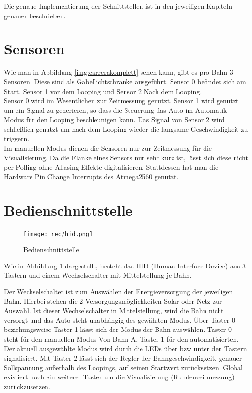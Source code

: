 \documentclass[a4paper, 11pt]{report}
\begin{document}
	Die genaue Implementierung der Schnittstellen ist in den jeweiligen Kapiteln genauer beschrieben.
	\section{Sensoren}
			Wie man in Abbildung \ref{img:carrerakomplett} sehen kann, gibt es pro Bahn 3 Sensoren. Diese sind als Gabellichtschranke ausgeführt. Sensor 0 befindet sich am Start, Sensor 1 vor dem Looping und 		Sensor 2 Nach dem Looping.\\


		Sensor 0 wird im Wesentlichen zur Zeitmessung genutzt.
		Sensor 1 wird genutzt um ein Signal zu generieren, so dass die Steuerung das Auto im Automatik-Modus für den Looping beschleunigen kann.
		Das Signal von Sensor 2 wird schließlich genutzt um nach dem Looping wieder die langsame Geschwindigkeit zu triggern.\\

		Im manuellen Modus dienen die Sensoren nur zur Zeitmessung für die Visualisierung.
		Da die Flanke eines Sensors nur sehr kurz ist, lässt sich diese nicht per Polling ohne Aliasing Effekte digitalisieren. Stattdessen hat man die Hardware Pin Change Interrupts des Atmega2560 genutzt.
	\section{Bedienschnittstelle}
		\begin{figure}[ht]
			\centering
			\texttt{[image: rec/hid.png]}
			\caption{Bedienschnittstelle}
			\label{img:hid}
		\end{figure}
		Wie in Abbildung \ref{img:hid} dargestellt, besteht das HID (Human Interface Device) aus 3 Tastern und einem Wechselschalter mit Mittelstellung je Bahn.

		Der Wechselschalter ist zum Auswählen der Energieversorgung der jeweiligen Bahn. Hierbei stehen die 2 Versorgungsmöglichkeiten Solar oder Netz zur Auswahl. Ist dieser Wechselschalter in Mittelstellung, wird die Bahn nicht versorgt und das Auto steht unabhängig des gewählten Modus.
		Über Taster 0 beziehungsweise Taster 1 lässt sich der Modus der Bahn auswählen. Taster 0 steht für den manuellen Modus Von Bahn A, Taster 1 für den automatisierten. Der aktuell ausgewählte Modus wird durch die LEDs über bzw unter den Tastern signalisiert.
		Mit Taster 2 lässt sich der Regler der Bahngeschwindigkeit, genauer Sollspannung außerhalb des Loopings, auf seinen Startwert zurücksetzen.
		Global existiert noch ein weiterer Taster um die Visualisierung (Rundenzeitmessung) zurückzusetzen.
\end{document}
